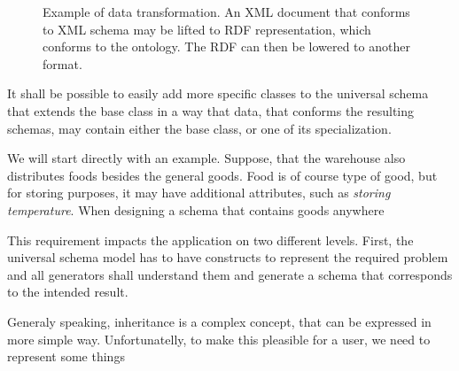 \begin{figure}
    \caption{Example of data transformation. An XML document that conforms to XML schema may be lifted to RDF representation, which conforms to the ontology. The RDF can then be lowered to another format.}
\end{figure}


\begin{requirement}
    It shall be possible to easily add more specific classes to the universal schema that extends the base class in a way that data, that conforms the resulting schemas, may contain either the base class, or one of its specialization.
\end{requirement}

\begin{showcase}
    We will start directly with an example. Suppose, that the warehouse also distributes foods besides the general goods. Food is of course type of good, but for storing purposes, it may have additional attributes, such as \textit{storing temperature}. When designing a schema that contains goods anywhere


\end{showcase}

This requirement impacts the application on two different levels. First, the universal schema model has to have constructs to represent the required problem and all generators shall understand them and generate a schema that corresponds to the intended result.

Generaly speaking, inheritance is a complex concept, that can be expressed in more simple way. Unfortunatelly, to make this pleasible for a user, we need to represent some things %


